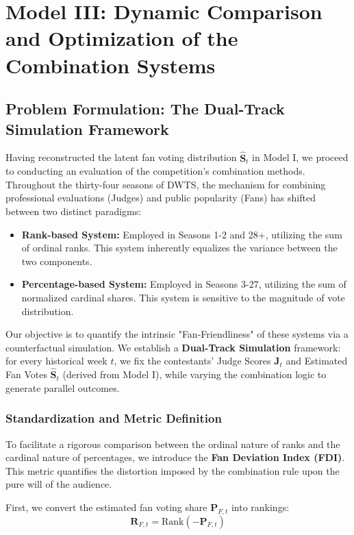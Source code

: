 \section{Model III: Dynamic Comparison and Optimization of the Combination Systems}

\subsection{Problem Formulation: The Dual-Track Simulation Framework}
Having reconstructed the latent fan voting distribution $\hat{\mathbf{S}}_t$
in Model I, we proceed to conducting
an evaluation of the competition's combination methods.
Throughout the thirty-four seasons of DWTS,
the mechanism for combining professional evaluations (Judges)
and public popularity (Fans) has shifted between two distinct paradigms:
\begin{itemize}
    \item \textbf{Rank-based System:} Employed in Seasons 1-2 and 28+,
          utilizing the sum of ordinal ranks.
          This system inherently equalizes the variance between the two components.
    \item \textbf{Percentage-based System:} Employed in Seasons 3-27,
          utilizing the sum of normalized cardinal shares.
          This system is sensitive to the magnitude of vote distribution.
\end{itemize}

Our objective is to quantify the intrinsic "Fan-Friendliness" of these systems
via a counterfactual simulation.
We establish a \textbf{Dual-Track Simulation} framework:
for every historical week $t$,
we fix the contestants' Judge Scores $\mathbf{J}_t$ and
Estimated Fan Votes $\hat{\mathbf{S}}_t$ (derived from Model I),
while varying the combination logic to generate parallel outcomes.

\subsubsection{Standardization and Metric Definition}
To facilitate a rigorous comparison between the ordinal nature of ranks
and the cardinal nature of percentages,
we introduce the \textbf{Fan Deviation Index (FDI)}.
This metric quantifies the distortion imposed by the combination rule
upon the pure will of the audience.

First, we convert the estimated fan voting share $\mathbf{P}_{F,t}$ into rankings:
\begin{equation}
    \mathbf{R}_{F,t} = \text{Rank}(-\mathbf{P}_{F,t})
\end{equation}

